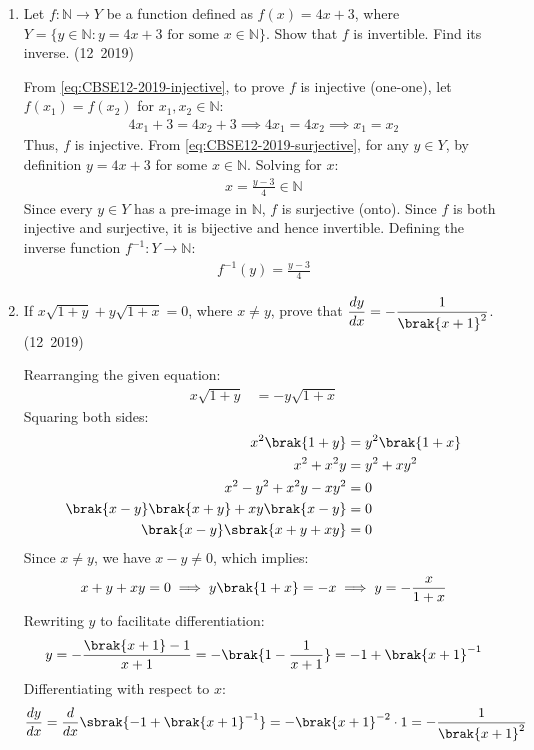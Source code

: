 \begin{enumerate}[label=\thesubsection.\arabic*, ref=\thesubsection.\theenumi]
\item Let $f:\mathbb{N}\to Y$ be a function defined as $f(x)=4x+3$, where $Y=\{y\in\mathbb{N}:y=4x+3\text{ for some }x\in\mathbb{N}\}$. Show that $f$ is invertible. Find its inverse.
\hfill (12~2019)

\solution
From \eqref{eq:CBSE12-2019-injective}, to prove $f$ is injective (one-one), let $f(x_1) = f(x_2)$ for $x_1, x_2 \in \mathbb{N}$:
\begin{align}
	4x_1 + 3 = 4x_2 + 3 \implies 4x_1 = 4x_2 \implies x_1 = x_2
\end{align}
Thus, $f$ is injective.
From \eqref{eq:CBSE12-2019-surjective}, for any $y \in Y$, by definition $y = 4x + 3$ for some $x \in \mathbb{N}$. Solving for $x$:
\begin{align}
	x = \frac{y - 3}{4} \in \mathbb{N}
\end{align}
Since every $y \in Y$ has a pre-image in $\mathbb{N}$, $f$ is surjective (onto).
Since $f$ is both injective and surjective, it is bijective and hence invertible.
Defining the inverse function $f^{-1}: Y \to \mathbb{N}$:
\begin{align}
	f^{-1}(y) = \frac{y - 3}{4}
\end{align}

\item If $x\sqrt{1+y}+y\sqrt{1+x}=0$, where $x \neq y$, prove that $\dfrac{dy}{dx} = -\dfrac{1}{\brak{x+1}^2}$.
\hfill (12~2019)

\solution
Rearranging the given equation:
\begin{align}
	x\sqrt{1+y} &= -y\sqrt{1+x}
\end{align}
Squaring both sides:
\begin{align}
	x^2\brak{1+y} &= y^2\brak{1+x} \\
	x^2 + x^2y &= y^2 + xy^2 \\
	x^2 - y^2 + x^2y - xy^2 &= 0 \\
	\brak{x - y}\brak{x + y} + xy\brak{x - y} &= 0 \\
	\brak{x - y}\sbrak{x + y + xy} &= 0
\end{align}
Since $x \neq y$, we have $x - y \neq 0$, which implies:
\begin{align}
	x + y + xy = 0 \implies y\brak{1 + x} = -x \implies y = -\frac{x}{1 + x}
\end{align}
Rewriting $y$ to facilitate differentiation:
\begin{align}
	y = -\frac{\brak{x + 1} - 1}{x + 1} = -\brak{1 - \frac{1}{x+1}} = -1 + \brak{x+1}^{-1}
\end{align}
Differentiating with respect to $x$:
\begin{align}
	\frac{dy}{dx} = \frac{d}{dx}\sbrak{-1 + \brak{x+1}^{-1}} = -\brak{x+1}^{-2}\cdot 1 = -\frac{1}{\brak{x+1}^2}
\end{align}



\end{enumerate}
